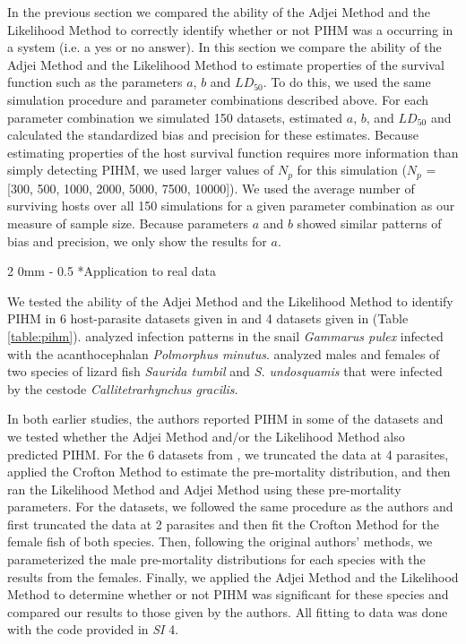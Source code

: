 \documentclass[12pt, a4paper]{article}
\makeatletter
\renewcommand{\subsection}{\@startsection
{subsection}%
{2}%
{0mm}%
{-\baselineskip}%
{0.5\baselineskip}%
{\normalfont\bf}} %
\makeatother
\begin{document}
In the previous section we compared the ability of the Adjei Method and the Likelihood Method to correctly identify whether or not PIHM was a occurring in a system (i.e. a yes or no answer). In this section we compare the ability of the Adjei Method and the Likelihood Method to estimate properties of the survival function such as the parameters $a$, $b$ and $LD_{50}$.  To do this, we used the same simulation procedure and parameter combinations described above. For each parameter
combination we simulated 150 datasets, estimated $a$, $b$, and $LD_{50}$ and calculated the standardized bias and
precision \citep{Walther2005} for these estimates.  Because estimating properties of the host survival function requires more information than simply detecting PIHM, we used larger values of $N_p$ for this simulation ($N_p$ = [300, 500, 1000, 2000, 5000, 7500,
10000]).  We used the average number of surviving hosts over all 150 simulations for a given parameter combination as our measure of sample size.  Because parameters $a$ and $b$ showed similar patterns of bias and precision, we only show the results for $a$.


\subsection*{Application to real data}

We tested the ability of the Adjei Method and the Likelihood Method to identify
PIHM in 6 host-parasite datasets given in \cite{Crofton1971a} and 4 datasets
given in \cite{Adjei1986} (Table \ref{table:pihm}). \citeauthor{Crofton1971a} analyzed infection patterns in the snail \emph{Gammarus pulex} infected with the
acanthocephalan \emph{Polmorphus minutus}. \citeauthor{Adjei1986} analyzed males and females of two species of lizard fish \emph{Saurida tumbil} and
\emph{S. undosquamis} that were infected by the cestode
\emph{Callitetrarhynchus gracilis}.

In both earlier studies, the authors reported PIHM in some of the datasets and we tested whether the Adjei
Method and/or the Likelihood Method also predicted PIHM. For the 6 datasets from
\cite{Crofton1971a}, we truncated the data at 4 parasites, applied the Crofton
Method to estimate the pre-mortality distribution, and then ran the Likelihood
Method and Adjei Method using these pre-mortality parameters.  For the
\cite{Adjei1986} datasets, we followed the same procedure as the authors and
first truncated the data at 2 parasites and then fit the Crofton Method for the
female fish of both species.  Then, following the original authors' methods, we parameterized the male pre-mortality
distributions for each species with the results from the females.  Finally, we
applied the Adjei Method and the Likelihood Method to determine whether or not
PIHM was significant for these species and compared our results to those given by the authors.  All fitting to data was done with the code provided in \emph{SI} 4.
\end{document}
